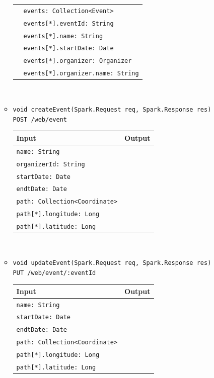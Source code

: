 \documentclass[a4paper, hidelinks, 12pt]{report}
\begin{document}
\begin{itemize}
\begin{itemize}
\begin{tabular}{l | l}
			\hline
				& \verb|events: Collection<Event>| \\
				& \verb|events[*].eventId: String| \\
				& \verb|events[*].name: String| \\
				& \verb|events[*].startDate: Date| \\
				& \verb|events[*].organizer: Organizer| \\
				& \verb|events[*].organizer.name: String| \\
			\end{tabular}\\
			\item{\verb|void createEvent(Spark.Request req, Spark.Response res)|\\ \verb|POST /web/event|}\\
			\begin{tabular}{l | l}
			\textbf{Input} & \textbf{Output} \\
			\hline
				\verb|name: String| & \\
				\verb|organizerId: String| & \\
				\verb|startDate: Date| & \\
				\verb|endtDate: Date| & \\
				\verb|path: Collection<Coordinate>| & \\
				\verb|path[*].longitude: Long| & \\
				\verb|path[*].latitude: Long| & \\
			\end{tabular}\\
			\item{\verb|void updateEvent(Spark.Request req, Spark.Response res)|\\ \verb|PUT /web/event/:eventId|}\\
			\begin{tabular}{l | l}
			\textbf{Input} & \textbf{Output} \\
			\hline
				\verb|name: String| & \\
				\verb|startDate: Date| & \\
				\verb|endtDate: Date| & \\
				\verb|path: Collection<Coordinate>| & \\
				\verb|path[*].longitude: Long| & \\
				\verb|path[*].latitude: Long| & \\
			\end{tabular}\\
			\end{itemize}

\end{itemize}
\end{document}
